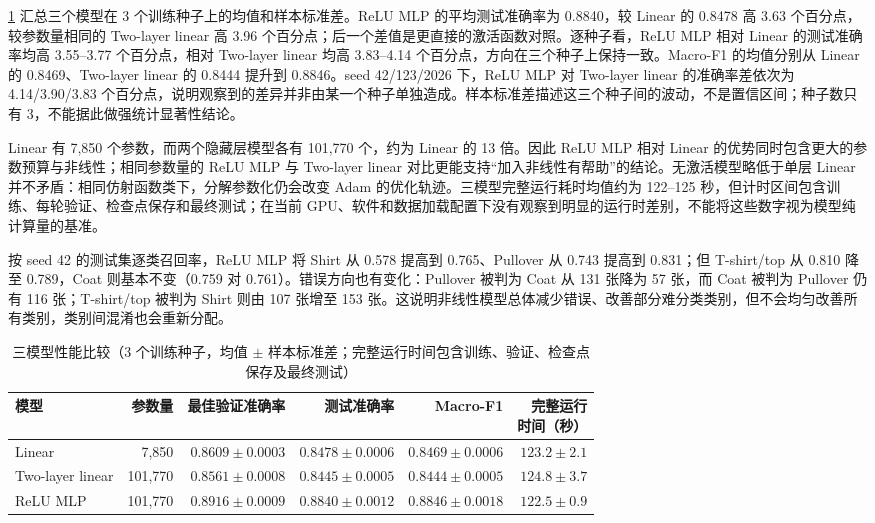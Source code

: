 \documentclass[dvipsnames,svgnames,a4paper,11pt]{article}
\begin{document}
\cref{tab:compare} 汇总三个模型在 3 个训练种子上的均值和样本标准差。ReLU MLP 的平均测试准确率为 0.8840，较 Linear 的 0.8478 高 3.63 个百分点，较参数量相同的 Two-layer linear 高 3.96 个百分点；后一个差值是更直接的激活函数对照。逐种子看，ReLU MLP 相对 Linear 的测试准确率均高 3.55--3.77 个百分点，相对 Two-layer linear 均高 3.83--4.14 个百分点，方向在三个种子上保持一致。Macro-F1 的均值分别从 Linear 的 0.8469、Two-layer linear 的 0.8444 提升到 0.8846。seed 42/123/2026 下，ReLU MLP 对 Two-layer linear 的准确率差依次为 4.14/3.90/3.83 个百分点，说明观察到的差异并非由某一个种子单独造成。样本标准差描述这三个种子间的波动，不是置信区间；种子数只有 3，不能据此做强统计显著性结论。

Linear 有 7,850 个参数，而两个隐藏层模型各有 101,770 个，约为 Linear 的 13 倍。因此 ReLU MLP 相对 Linear 的优势同时包含更大的参数预算与非线性；相同参数量的 ReLU MLP 与 Two-layer linear 对比更能支持“加入非线性有帮助”的结论。无激活模型略低于单层 Linear 并不矛盾：相同仿射函数类下，分解参数化仍会改变 Adam 的优化轨迹。三模型完整运行耗时均值约为 122--125 秒，但计时区间包含训练、每轮验证、检查点保存和最终测试；在当前 GPU、软件和数据加载配置下没有观察到明显的运行时差别，不能将这些数字视为模型纯计算量的基准。

按 seed 42 的测试集逐类召回率，ReLU MLP 将 Shirt 从 0.578 提高到 0.765、Pullover 从 0.743 提高到 0.831；但 T-shirt/top 从 0.810 降至 0.789，Coat 则基本不变（0.759 对 0.761）。错误方向也有变化：Pullover 被判为 Coat 从 131 张降为 57 张，而 Coat 被判为 Pullover 仍有 116 张；T-shirt/top 被判为 Shirt 则由 107 张增至 153 张。这说明非线性模型总体减少错误、改善部分难分类类别，但不会均匀改善所有类别，类别间混淆也会重新分配。

\begin{table}[H]
\centering
\caption{三模型性能比较（3 个训练种子，均值 $\pm$ 样本标准差；完整运行时间包含训练、验证、检查点保存及最终测试）}
\label{tab:compare}
\small
\begin{tabular}{lrrrrr}
\toprule
模型 & 参数量 & 最佳验证准确率 & 测试准确率 & Macro-F1 & \makecell{完整运行\\时间（秒）} \\
\midrule
Linear & 7,850 & $0.8609\pm0.0003$ & $0.8478\pm0.0006$ & $0.8469\pm0.0006$ & $123.2\pm2.1$ \\
Two-layer linear & 101,770 & $0.8561\pm0.0008$ & $0.8445\pm0.0005$ & $0.8444\pm0.0005$ & $124.8\pm3.7$ \\
ReLU MLP & 101,770 & $0.8916\pm0.0009$ & $0.8840\pm0.0012$ & $0.8846\pm0.0018$ & $122.5\pm0.9$ \\
\bottomrule
\end{tabular}
\end{table}
\end{document}
